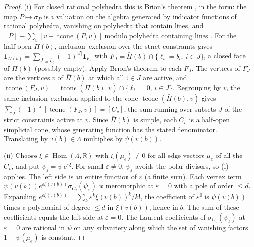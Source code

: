 \documentclass[12pt,letterpaper]{article}
\numberwithin{equation}{section}
\theoremstyle{plain}
\theoremstyle{remark}
\theoremstyle{plain}
\theoremstyle{definition}
\theoremstyle{remark}
\theoremstyle{remark}
\DeclareMathOperator{\Hom}{Hom}
\DeclareMathOperator{\tcone}{tcone}
\newcommand{\one}{\mathbf 1}
\begin{document}
\begin{proof}
(i) For closed rational polyhedra this is Brion's theorem \cite{Br88}, in the form: the map $P\mapsto\sigma_P$ is a valuation on the algebra generated by indicator functions of rational polyhedra, vanishing on polyhedra that contain lines, and $[P]\equiv\sum_v[v+\tcone(P,v)]$ modulo polyhedra containing lines \cite{Ba08}. For the half-open $\Pi(b)$, inclusion--exclusion over the strict constraints gives $\one_{\Pi(b)}=\sum_{J\subseteq I_<}(-1)^{|J|}\one_{F_J}$ with $F_J=\bar\Pi(b)\cap\{\ell_i=b_i,\ i\in J\}$, a closed face of $\bar\Pi(b)$ (possibly empty). Apply Brion's theorem to each $F_J$. The vertices of $F_J$ are the vertices $v$ of $\bar\Pi(b)$ at which all $i\in J$ are active, and $\tcone(F_J,v)=\tcone(\bar\Pi(b),v)\cap\{\ell_i=0,\ i\in J\}$. Regrouping by $v$, the same inclusion--exclusion applied to the cone $\tcone(\bar\Pi(b),v)$ gives $\sum_{J}(-1)^{|J|}[\tcone(F_J,v)]=[C_v]$, the sum running over subsets $J$ of the strict constraints active at $v$. Since $\bar\Pi(b)$ is simple, each $C_v$ is a half-open simplicial cone, whose generating function has the stated denominator. Translating by $v(b)\in\Lambda$ multiplies by $\psi(v(b))$.

(ii) Choose $\xi\in\Hom(\Lambda,\mathbb{R})$ with $\xi(\mu_e)\neq0$ for all edge vectors $\mu_e$ of all the $C_v$, and put $\psi_\varepsilon=\psi\,e^{\varepsilon\xi}$. For small $\varepsilon\ne0$, $\psi_\varepsilon$ avoids the polar divisors, so (i) applies. The left side is an entire function of $\varepsilon$ (a finite sum). Each vertex term $\psi(v(b))e^{\varepsilon\xi(v(b))}\sigma_{C_v}(\psi_\varepsilon)$ is meromorphic at $\varepsilon=0$ with a pole of order $\le d$. Expanding $e^{\varepsilon\xi(v(b))}=\sum_k\varepsilon^k\xi(v(b))^k/k!$, the coefficient of $\varepsilon^0$ is $\psi(v(b))$ times a polynomial of degree $\le d$ in $\xi(v(b))$, hence in $b$. The sum of these coefficients equals the left side at $\varepsilon=0$. The Laurent coefficients of $\sigma_{C_v}(\psi_\varepsilon)$ at $\varepsilon=0$ are rational in $\psi$ on any subvariety along which the set of vanishing factors $1-\psi(\mu_e)$ is constant.
\end{proof}
\end{document}
